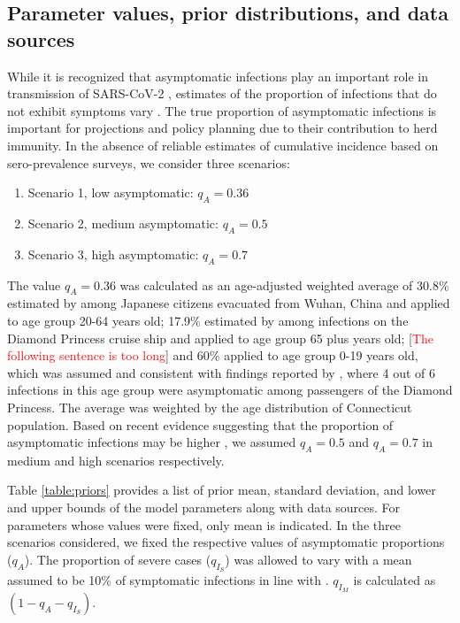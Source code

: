 \documentclass[11pt]{article}
\newcommand{\comments}[1]{[\textcolor{red}{#1}]}
\begin{document}
\subsection{Parameter values, prior distributions, and data sources}

While it is recognized that asymptomatic infections play an important role in transmission of SARS-CoV-2 \citep{furukawa2020evidence}, estimates of the proportion of infections that do not exhibit symptoms vary \citep{he2020estimation, nishiura2020estimation, mizumoto2020estimating, emery2020contribution}. The true proportion of asymptomatic infections is important for projections and policy planning due to their contribution to herd immunity. In the absence of reliable estimates of cumulative incidence based on sero-prevalence surveys, we consider three scenarios: 

\begin{enumerate}
	\item Scenario 1, low asymptomatic: $q_A = 0.36$
	\item Scenario 2, medium asymptomatic: $q_A = 0.5$
	\item Scenario 3, high asymptomatic: $q_A = 0.7$
\end{enumerate}

The value $q_A = 0.36$ was calculated as an age-adjusted weighted average of 30.8\% estimated by \citet{nishiura2020estimation} among Japanese citizens evacuated from Wuhan, China and applied to age group 20-64 years old; 17.9\% estimated by \citet{mizumoto2020estimating} among infections on the Diamond Princess cruise ship and applied to age group 65 plus years old; \comments{The following sentence is too long} and 60\% applied to age group 0-19 years old, which was assumed and consistent with findings reported by \citet{russell2020estimating}, where 4 out of 6 infections in this age group were asymptomatic among passengers of the Diamond Princess. The average was weighted by the age distribution of Connecticut population. Based on recent evidence suggesting that the proportion of asymptomatic infections may be higher \citep{he2020estimation, emery2020contribution, kimball2020asymptomatic}, we assumed $q_A = 0.5$ and $q_A = 0.7$ in medium and high scenarios respectively.  

Table \ref{table:priors} provides a list of prior mean, standard deviation, and lower and upper bounds of the model parameters along with data sources. For parameters whose values were fixed, only mean is indicated. In the three scenarios considered, we fixed the respective values of asymptomatic proportions ($q_A$). The proportion of severe cases ($q_{I_S}$) was allowed to vary with a mean assumed to be 10\% of symptomatic infections in line with \citep{verity2020estimates, bi2020epidemiology, salje2020estimating}. $q_{I_M}$ is calculated as $(1 - q_A - q_{I_S})$. 
\end{document}
